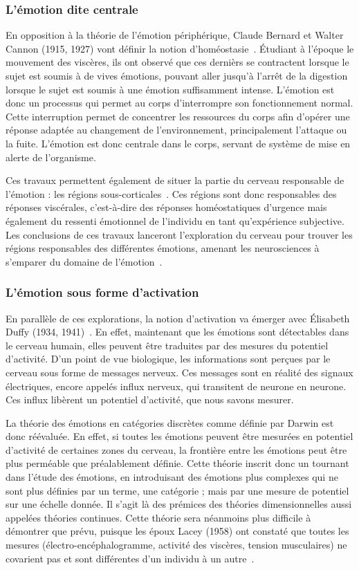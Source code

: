 \subsubsection{L'émotion dite centrale}
En opposition à la théorie de l'émotion périphérique, Claude Bernard et Walter Cannon (1915, 1927) vont définir la notion d’homéostasie~\cite{Cannon1915,Cannon1927}. Étudiant à l'époque le mouvement des viscères, ils ont observé que ces dernièrs se contractent lorsque le sujet est soumis à de vives émotions, pouvant aller jusqu'à l'arrêt de la digestion lorsque le sujet est soumis à une émotion suffisamment intense. L'émotion est donc un processus qui permet au corps d'interrompre son fonctionnement normal. Cette interruption permet de concentrer les ressources du corps afin d'opérer une réponse adaptée au changement de l'environnement, principalement l'attaque ou la fuite. L'émotion est donc centrale dans le corps, servant de système de mise en alerte de l'organisme.

Ces travaux permettent également de situer la partie du cerveau responsable de l'émotion : les régions sous-corticales~\cite{Cannon1933}. Ces régions sont donc responsables des réponses viscérales, c'est-à-dire des réponses homéostatiques d'urgence mais également du ressenti émotionnel de l'individu en tant qu'expérience subjective.
Les conclusions de ces travaux lanceront l'exploration du cerveau pour trouver les régions responsables des différentes émotions, amenant les neurosciences à s'emparer du domaine de l'émotion~\cite{Bard1934}.

\subsubsection{L'émotion sous forme d'activation}
En parallèle de ces explorations, la notion d'activation va émerger avec Élisabeth Duffy (1934, 1941)~\cite{Duffy1934,Duffy1941}. En effet, maintenant que les émotions sont détectables dans le cerveau humain, elles peuvent être traduites par des mesures du potentiel d'activité. D'un point de vue biologique, les informations sont perçues par le cerveau sous forme de messages nerveux. Ces messages sont en réalité des signaux électriques, encore appelés influx nerveux, qui transitent de neurone en neurone. Ces influx libèrent un potentiel d'activité, que nous savons mesurer.

La théorie des émotions en catégories discrètes comme définie par Darwin est donc réévaluée. En effet, si toutes les émotions peuvent être mesurées en potentiel d'activité de certaines zones du cerveau, la frontière entre les émotions peut être plus perméable que préalablement définie. Cette théorie inscrit donc un tournant dans l'étude des émotions, en introduisant des émotions plus complexes qui ne sont plus définies par un terme, une catégorie ; mais par une mesure de potentiel sur une échelle donnée. Il s'agit là des prémices des théories dimensionnelles aussi appelées théories continues.
Cette théorie sera néanmoins plus difficile à démontrer que prévu, puisque les époux Lacey (1958) ont constaté que toutes les mesures (électro-encéphalogramme, activité des viscères, tension musculaires) ne covarient pas et sont différentes d'un individu à un autre~\cite{Lacey1958}.

